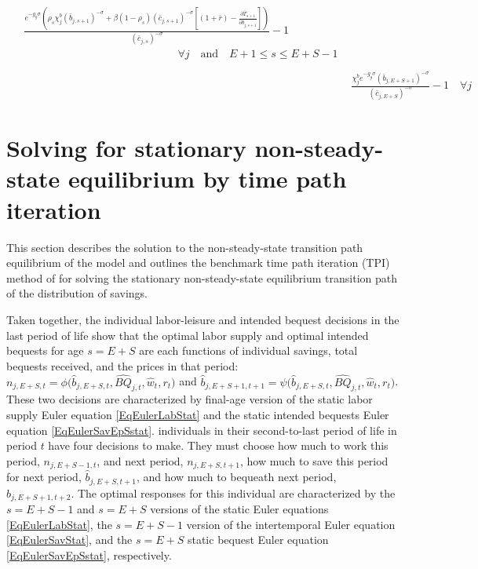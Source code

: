 \documentclass[letterpaper,12pt]{article}
\theoremstyle{definition}
\begin{document}
\begin{enumerate}
\begin{align}
        \begin{split}
          &\frac{e^{-g_y\sigma}\left(\rho_s\chi^b_j \left(\bar{b}_{j,s+1}\right)^{-\sigma} + \beta(1-\rho_s)(\bar{c}_{j,s+1})^{-\sigma}\left[(1 + \bar{r}) - \frac{\partial \bar{T}_{s+1}}{\partial \bar{b}_{j,s+1}}\right]\right)}{(\bar{c}_{j,s})^{-\sigma}} - 1 \\
          &\qquad\qquad\qquad\qquad\qquad\qquad\qquad\forall j \quad\text{and}\quad E+1\leq s\leq E+S-1 \\
        \end{split} \label{EqSSeulerrSav} \\
        &\frac{\chi^b_j e^{-g_y\sigma}(\bar{b}_{j,E+S+1})^{-\sigma}}{\left(\bar{c}_{j,E+S}\right)^{-\sigma}} - 1 \quad\forall j \label{EqSSeulerrBeq}
      \end{align}
  \end{enumerate}


\newpage
\section{Solving for stationary non-steady-state equilibrium by time path iteration}\label{AppNonSSsolve}

  \setcounter{equation}{0}

  This section describes the solution to the non-steady-state transition path equilibrium of the model and outlines the benchmark time path iteration (TPI) method of \citet{AuerbachKotlikoff:1987} for solving the stationary non-steady-state equilibrium transition path of the distribution of savings.

  \vspace{10mm}

  \noindent Taken together, the individual labor-leisure and intended bequest decisions in the last period of life show that the optimal labor supply and optimal intended bequests for age $s=E+S$ are each functions of individual savings, total bequests received, and the prices in that period: $n_{j,E+S,t}=\phi\bigl(\hat{b}_{j,E+S,t},\hat{BQ}_{j,t},\hat{w}_t,r_t\bigr)$ and $\hat{b}_{j,E+S+1,t+1}=\psi\bigl(\hat{b}_{j,E+S,t},\hat{BQ}_{j,t},\hat{w}_t,r_t\bigr)$. These two decisions are characterized by final-age version of the static labor supply Euler equation \eqref{EqEulerLabStat} and the static intended bequests Euler equation \eqref{EqEulerSavEpSstat}. individuals in their second-to-last period of life in period $t$ have four decisions to make. They must choose how much to work this period, $n_{j,E+S-1,t}$, and next period, $n_{j,E+S,t+1}$, how much to save this period for next period, $\hat{b}_{j,E+S,t+1}$, and how much to bequeath next period, $\hat{b}_{j,E+S+1,t+2}$. The optimal responses for this individual are characterized by the $s=E+S-1$ and $s=E+S$ versions of the static Euler equations \eqref{EqEulerLabStat}, the $s=E+S-1$ version of the intertemporal Euler equation \eqref{EqEulerSavStat}, and the $s=E+S$ static bequest Euler equation \eqref{EqEulerSavEpSstat}, respectively.
\end{document}
